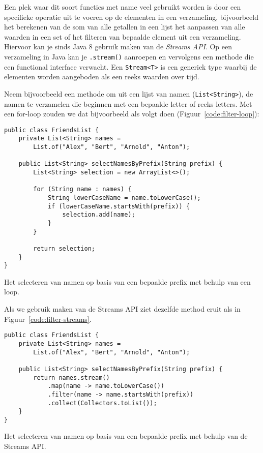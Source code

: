 Een plek waar dit soort functies met name veel gebruikt worden is door een 
specifieke operatie uit te voeren op de elementen in een verzameling, bijvoorbeeld
het berekenen van de som van alle getallen in een lijst 
het aanpassen van alle waarden in een set of 
het filteren van bepaalde element uit een verzameling.
Hiervoor kan je sinds Java 8 gebruik maken van de \textit{Streams API}.
Op een verzameling in Java kan je \texttt{.stream()} aanroepen en vervolgens 
een methode die een functional interface verwacht. Een \texttt{Stream<T>} is 
een generiek type waarbij de elementen worden aangeboden als een reeks waarden over tijd.

Neem bijvoorbeeld een methode om uit een lijst van namen (\texttt{List<String>}),
de namen te verzamelen die beginnen met een bepaalde letter of reeks letters.
Met een for-loop zouden we dat bijvoorbeeld als volgt doen (Figuur~\ref{code:filter-loop}):

\begin{listing}[H]
\begin{verbatim}
public class FriendsList {
    private List<String> names = 
        List.of("Alex", "Bert", "Arnold", "Anton");

    public List<String> selectNamesByPrefix(String prefix) {
        List<String> selection = new ArrayList<>();

        for (String name : names) {
            String lowerCaseName = name.toLowerCase();
            if (lowerCaseName.startsWith(prefix)) {
                selection.add(name);
            }
        }

        return selection;
    }
}
\end{verbatim}
\caption{Het selecteren van namen op basis van een bepaalde prefix met behulp van een loop.}
\label{code:filter-loop}
\end{listing}

Als we gebruik maken van de Streams API ziet dezelfde method eruit als in Figuur~\ref{code:filter-streams}.

\begin{listing}[H]
\begin{verbatim}
public class FriendsList {
    private List<String> names = 
        List.of("Alex", "Bert", "Arnold", "Anton");

    public List<String> selectNamesByPrefix(String prefix) {
        return names.stream()
            .map(name -> name.toLowerCase())
            .filter(name -> name.startsWith(prefix))
            .collect(Collectors.toList());
    }
}
\end{verbatim}
\caption{Het selecteren van namen op basis van een bepaalde prefix met behulp van de Streams API.}
\label{code:filter-loop}
\end{listing}

